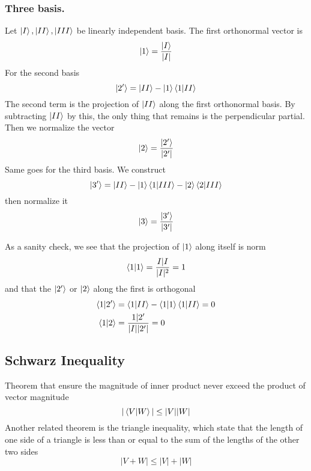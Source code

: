 \documentclass[../main.tex]{subfiles}
\begin{document}
\subsubsection{Three basis.}
Let $\ket{I}, \ket{II}, \ket{III}$ be linearly independent basis.
The first orthonormal vector is
\begin{equation*}
	\ket{1}=\frac{\ket{I}}{|I|}
\end{equation*}
For the second basis
\begin{equation*}
	\ket{2'}=\ket{II}-\ket{1}\braket{1|II}
\end{equation*}
The second term is the projection of $\ket{II}$ along the first orthonormal basis.
By subtracting $\ket{II}$ by this, the only thing that remains is the perpendicular partial.
Then we normalize the vector
\begin{equation*}
	\ket{2}=\frac{\ket{2'}}{|2'|}
\end{equation*}
Same goes for the third basis.
We construct
\begin{equation*}
	\ket{3'} =\ket{II}-\ket{1}\braket{1|III}-\ket{2}\braket{2|III}
\end{equation*}
then normalize it
\begin{equation*}
	\ket{3}=\frac{\ket{3'}}{|3'|}
\end{equation*}

As a sanity check, we see that the projection of $\ket{1}$ along itself is norm
\begin{equation*}
	\braket{1|1}=\frac{I|I }{|I|^2}=1
\end{equation*}
and that the $\ket{2'}$ or $\ket{2}$ along the first is orthogonal
\begin{align*}
	\braket{1|2'} & =\braket{1|II}-\braket{1|1}\braket{1|II}=0 \\
	\braket{1|2}  & =\frac{1|2'}{|I||2'|}=0
\end{align*}

\subsection{Schwarz Inequality}
Theorem that ensure the magnitude of inner product never exceed the product of vector magnitude
\begin{equation*}
	|\braket{V|W}|\leq|V||W|
\end{equation*}
Another related theorem is the triangle inequality, which state that the length of one side of a triangle is less than or equal to the sum of the lengths of the other two sides
\begin{equation*}
	|V+W|\leq|V|+|W|
\end{equation*}
\end{document}
